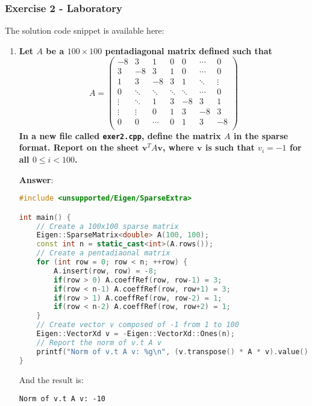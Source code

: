 \newpage

\subsubsection*{Exercise 2 - Laboratory}

The solution code snippet is available here:
\begin{center}
\end{center}
\begin{enumerate}[label=\textcolor{Green3}{\textbf{\arabic*.}}]
    \item \textcolor{Green3}{\textbf{%
        Let $A$ be a $100 \times 100$ pentadiagonal matrix defined such that
    }}
    \begin{equation*}
        A = \begin{pmatrix}
            -8 & 3 & 1 & 0 & 0 & \cdots & 0 \\
             3 & -8 & 3 & 1 & 0 & \cdots & 0 \\
             1 & 3 & -8 & 3 & 1 & \ddots & \vdots \\
             0 & \ddots & \ddots & \ddots & \ddots & \cdots & 0 \\
            \vdots & \ddots & 1 & 3 & -8 & 3 & 1 \\
            \vdots & \vdots & 0 & 1 & 3 & -8 & 3 \\
            0 & 0 & \cdots & 0 & 1 & 3 & -8 \\
        \end{pmatrix}
    \end{equation*}
    \textcolor{Green3}{\textbf{In a new file called \texttt{exer2.cpp}, define the matrix $A$ in the sparse format. Report on the sheet $\mathbf{v}^{T} A \mathbf{v}$, where $\mathbf{v}$ is such that $v_{i} = -1$ for all $0 \le i < 100$.}}

    \textbf{Answer}:
    \begin{lstlisting}[language=C++]
#include <unsupported/Eigen/SparseExtra>

int main() {
    // Create a 100x100 sparse matrix
    Eigen::SparseMatrix<double> A(100, 100);
    const int n = static_cast<int>(A.rows());
    // Create a pentadiaonal matrix
    for (int row = 0; row < n; ++row) {
        A.insert(row, row) = -8;
        if(row > 0) A.coeffRef(row, row-1) = 3;
        if(row < n-1) A.coeffRef(row, row+1) = 3;
        if(row > 1) A.coeffRef(row, row-2) = 1;
        if(row < n-2) A.coeffRef(row, row+2) = 1;
    }
    // Create vector v composed of -1 from 1 to 100
    Eigen::VectorXd v = -Eigen::VectorXd::Ones(n);
    // Report the norm of v.t A v
    printf("Norm of v.t A v: %g\n", (v.transpose() * A * v).value());
}\end{lstlisting}
    And the result is:
    \begin{lstlisting}
Norm of v.t A v: -10\end{lstlisting}



\end{enumerate}
